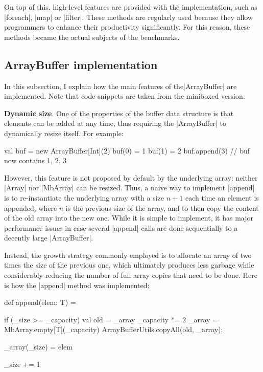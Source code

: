 On top of this, high-level features are provided with the implementation, such as |foreach|, |map| or |filter|. These methods are regularly used because they allow programmers to enhance their productivity significantly. For this reason, these methods became the actual subjects of the benchmarks.

\subsection{ArrayBuffer implementation}

In this subsection, I explain how the main features of the\linebreak |ArrayBuffer| are implemented. Note that code snippets are taken from the miniboxed version.

\textbf{Dynamic size}. One of the properties of the buffer data structure is that elements can be added at any time, thus requiring the |ArrayBuffer| to dynamically resize itself. For example: 

\begin{lstlisting-nobreak}
val buf = new ArrayBuffer[Int](2)
buf(0) = 1
buf(1) = 2
buf.append(3) // buf now contains {1, 2, 3}
\end{lstlisting-nobreak}

However, this feature is not proposed by default by the underlying array: neither |Array| nor |MbArray| can be resized. Thus, a naive way to implement |append| is to re-instantiate the underlying array with a size $n + 1$ each time an element is appended, where $n$ is the previous size of the array, and to then copy the content of the old array into the new one.
While it is simple to implement, it has major performance issues in case several |append| calls are done sequentially to a decently large |ArrayBuffer|.

Instead, the growth strategy commonly employed is to allocate an array of two times the size of the previous one, which ultimately produces less garbage while considerably reducing the number of full array copies that need to be done. Here is how the |append| method was implemented:

\begin{lstlisting-nobreak}
def append(elem: T) = {
  if (_size >= _capacity) {
    val old = _array
    _capacity *= 2
    _array = MbArray.empty[T](_capacity)
    ArrayBufferUtils.copyAll(old, _array);
  }

  _array(_size) = elem

  _size += 1
}
\end{lstlisting-nobreak}

